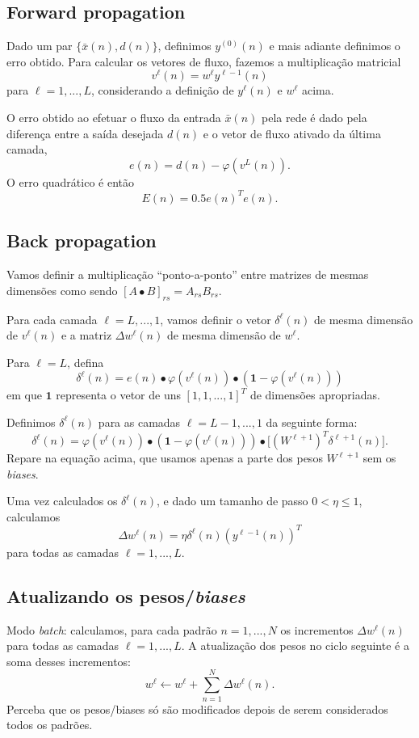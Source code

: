 \documentclass[12pt,a4paper]{article}
\begin{document}
\subsection{Forward propagation}
Dado um par $\big\{\bar x(n), d(n)\big\}$, definimos $y^{(0)}(n)$ e mais adiante definimos o erro obtido. Para calcular os vetores de fluxo, fazemos a multiplicação matricial
\[
v^{\ell}(n) = w^\ell y^{\ell-1}(n)
\]
para $\ell=1,...,L$, considerando a definição de $y^\ell(n)$ e $w^\ell$ acima.

O erro obtido ao efetuar o fluxo da entrada $\bar x(n)$ pela rede é dado pela diferença entre a saída desejada $d(n)$ e o vetor de fluxo ativado da última camada,
\[
e(n) = d(n) - \varphi(v^L(n)).
\]
O erro quadrático é então
\[
E(n) = 0.5e(n)^Te(n).
\]

\subsection{Back propagation}
Vamos definir a multiplicação ``ponto-a-ponto'' entre matrizes de mesmas dimensões como sendo $[A \bullet B]_{rs}=A_{rs}B_{rs}$.



Para cada camada $\ell=L,...,1$, vamos definir o vetor $\delta^\ell(n)$ de mesma dimensão de $v^\ell(n)$ e a matriz $\Delta w^\ell(n)$ de mesma dimensão de $w^\ell$.

Para $\ell=L$, defina
\[
\delta^\ell(n) = e(n) \bullet \varphi(v^\ell(n)) \bullet (\mathbf{1} - \varphi(v^\ell(n)))
\]
em que $\mathbf{1}$ representa o vetor de uns $[1,1,...,1]^T$ de dimensões apropriadas.

Definimos $\delta^\ell(n)$ para as camadas $\ell=L-1,...,1$ da seguinte forma:
\[
\delta^\ell(n) =\varphi(v^\ell(n)) \bullet (\mathbf{1}- \varphi(v^\ell(n))) \bullet \Big[(W^{\ell+1})^T\delta^{\ell+1}(n)\Big].
\]
Repare na equação acima, que usamos apenas a parte dos pesos $W^{\ell+1}$ sem os \textit{biases}.

Uma vez calculados os $\delta^\ell(n)$, e dado um tamanho de passo $0<\eta\le1$, calculamos
\[
\Delta w^\ell(n) = \eta\delta^\ell(n) (y^{\ell-1}(n))^T
\]
para todas as camadas $\ell=1,...,L$.

\subsection{Atualizando os pesos/\textit{biases}}
Modo \textit{batch}: calculamos, para cada  padrão $n=1,...,N$ os incrementos $\Delta w^\ell(n)$ para todas as camadas $\ell=1,...,L$. A atualização dos pesos no ciclo seguinte é a soma desses incrementos:
\[
w^\ell \gets w^\ell + \sum_{n=1}^N \Delta w^\ell(n).
\]
Perceba que os pesos/biases só são modificados depois de serem considerados todos os padrões.
\end{document}
